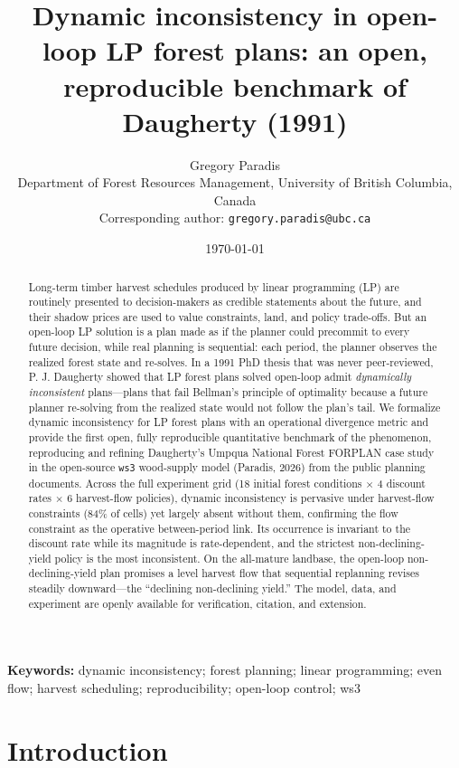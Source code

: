 \documentclass[12pt]{article}
\title{Dynamic inconsistency in open-loop LP forest plans: an open, reproducible benchmark of Daugherty (1991)}
\author{Gregory Paradis\\Department of Forest Resources Management, University of British Columbia, Canada\\Corresponding author: \texttt{gregory.paradis@ubc.ca}}
\date{\today}
\begin{document}
\maketitle

\noindent\textbf{Keywords:} dynamic inconsistency; forest planning; linear programming; even flow; harvest scheduling; reproducibility; open-loop control; ws3

\begin{abstract}
Long-term timber harvest schedules produced by linear programming (LP) are routinely presented to decision-makers as credible statements about the future, and their shadow prices are used to value constraints, land, and policy trade-offs. But an open-loop LP solution is a plan made as if the planner could precommit to every future decision, while real planning is sequential: each period, the planner observes the realized forest state and re-solves. In a 1991 PhD thesis that was never peer-reviewed, P. J. Daugherty showed that LP forest plans solved open-loop admit \emph{dynamically inconsistent} plans---plans that fail Bellman's principle of optimality because a future planner re-solving from the realized state would not follow the plan's tail. We formalize dynamic inconsistency for LP forest plans with an operational divergence metric and provide the first open, fully reproducible quantitative benchmark of the phenomenon, reproducing and refining Daugherty's Umpqua National Forest FORPLAN case study in the open-source \texttt{ws3} wood-supply model (Paradis, 2026) from the public planning documents. Across the full experiment grid (18 initial forest conditions $\times$ 4 discount rates $\times$ 6 harvest-flow policies), dynamic inconsistency is pervasive under harvest-flow constraints (84\% of cells) yet largely absent without them, confirming the flow constraint as the operative between-period link. Its occurrence is invariant to the discount rate while its magnitude is rate-dependent, and the strictest non-declining-yield policy is the most inconsistent. On the all-mature landbase, the open-loop non-declining-yield plan promises a level harvest flow that sequential replanning revises steadily downward---the ``declining non-declining yield.'' The model, data, and experiment are openly available for verification, citation, and extension.
\end{abstract}

\section{Introduction}
\end{document}
